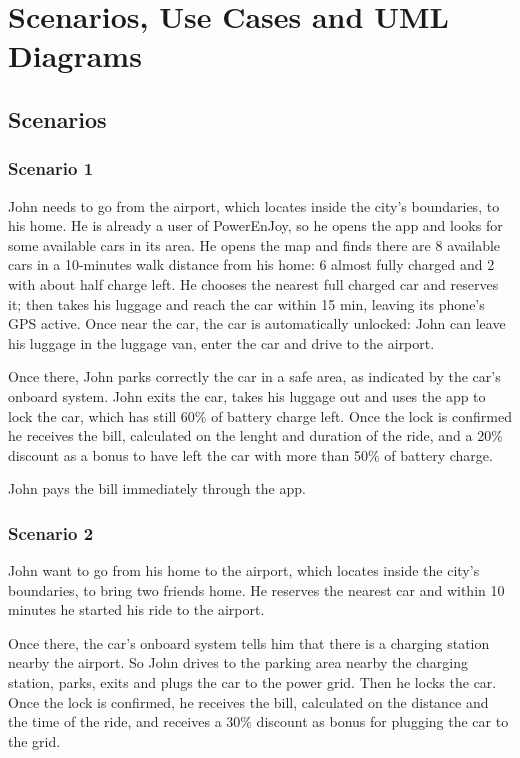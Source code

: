 \documentclass[11pt]{article} %
\newcommand{\pecomma}{PowerEnJoy, }
\begin{document}
\newpage
\section{Scenarios, Use Cases and UML Diagrams}

\subsection{Scenarios}

\subsubsection{Scenario 1}
John needs to go from the airport, which locates inside the city's boundaries, to his home. He is already a user of \pecomma so he opens the app and looks for some available cars in its area. He opens the map and finds there are 8 available cars in a 10-minutes walk distance from his home: 6 almost fully charged and 2 with about half charge left. He chooses the nearest full charged car and reserves it; then takes his luggage and reach the car within 15 min, leaving its phone's GPS active. Once near the car, the car is automatically unlocked: John can leave his luggage in the luggage van, enter the car and drive to the airport.

Once there, John parks correctly the car in a safe area, as indicated by the car's onboard system. John exits the car, takes his luggage out and uses the app to lock the car, which has still 60\% of battery charge left. Once the lock is confirmed he receives the bill, calculated on the lenght and duration of the ride, and a 20\% discount as a bonus to have left the car with more than 50\% of battery charge.

John pays the bill immediately through the app.

\subsubsection{Scenario 2}
John want to go from his home to the airport, which locates inside the city's boundaries, to bring two friends home. He reserves the nearest car and within 10 minutes he started his ride to the airport.

Once there, the car's onboard system tells him that there is a charging station nearby the airport. So John drives to the parking area nearby the charging station, parks, exits and plugs the car to the power grid. Then he locks the car.
Once the lock is confirmed, he receives the bill, calculated on the distance and the time of the ride, and receives a 30\% discount as bonus for plugging the car to the grid.
\end{document}
